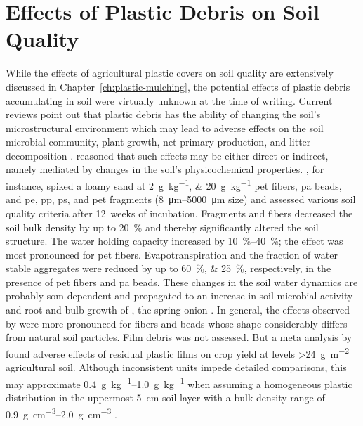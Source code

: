 \section{Effects of Plastic Debris on Soil Quality}
\label{sec:general-discussion:effects}

While the effects of agricultural plastic covers on soil quality are extensively discussed in Chapter~\ref{ch:plastic-mulching}, the potential effects of plastic debris accumulating in soil were virtually unknown at the time of writing.
Current reviews point out that plastic debris has the ability of changing the soil's microstructural environment which may lead to adverse effects on the soil microbial community, plant growth, net primary production, and litter decomposition \citep{RilligMicroplastic2021,MbachuRise2021,QiBehavior2020}.  reasoned that such effects may be either direct or indirect, namely mediated by changes in the soil's physicochemical properties. , for instance, spiked a loamy sand at \SIlist{2;20}{\gram\per\kilo\gram} \ac{pet} fibers, \ac{pa} beads, and \ac{pe}, \ac{pp}, \ac{ps}, and \ac{pet} fragments (\SIrange{8}{5000}{\micro\meter} size) and assessed various soil quality criteria after \SI{12}{weeks} of incubation. Fragments and fibers decreased the soil bulk density by up to \SI{20}{\percent} and thereby significantly altered the soil structure. The water holding capacity increased by \SIrange{10}{40}{\percent}; the effect was most pronounced for \ac{pet} fibers. Evapotranspiration and the fraction of water stable aggregates were reduced by up to \SIlist{60;25}{\percent}, respectively, in the presence of \ac{pet} fibers and \ac{pa} beads. These changes in the soil water dynamics are probably \ac{som}-dependent \citep{ZhangVariations2020,LiangEffects2021} and propagated to an increase in soil microbial activity and root and bulb growth of , the spring onion \citep{deSouzaMachadoMicroplastics2019}. In general, the effects observed by \citet{deSouzaMachadoMicroplastics2019} were more pronounced for fibers and beads whose shape considerably differs from natural soil particles. Film debris was not assessed. But a meta analysis by \citet{GaoEffects2019} found adverse effects of residual plastic films on crop yield at levels \SI{>24}{\gram\per\square\meter} agricultural soil. Although inconsistent units impede detailed comparisons, this may approximate \SIrange{0.4}{1.0}{\gram\per\kilo\gram} when assuming a homogeneous plastic distribution in the uppermost \SI{5}{\centi\meter} soil layer with a bulk density range of \SIrange{0.9}{2.0}{\gram\per\cubic\centi\meter} \citep{HornPhysical2016}.

